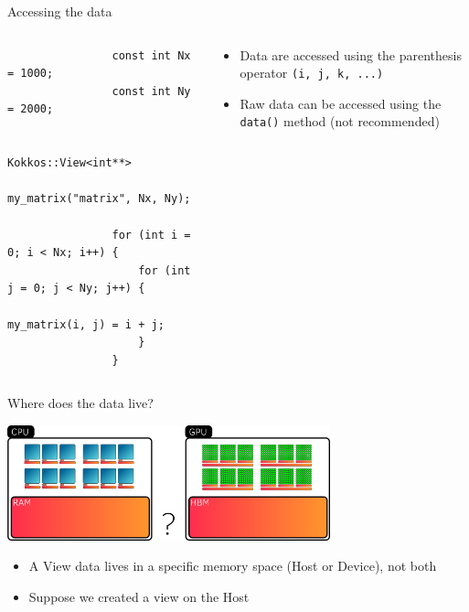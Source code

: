 \documentclass[aspectratio=169]{beamer}
\begin{document}
\begin{frame}[fragile]{Accessing the data}
    \begin{columns}
        \begin{column}{0.6\linewidth}
            \begin{verbatim}
                const int Nx = 1000;
                const int Ny = 2000;

                Kokkos::View<int**>
                    my_matrix("matrix", Nx, Ny);

                for (int i = 0; i < Nx; i++) {
                    for (int j = 0; j < Ny; j++) {
                        my_matrix(i, j) = i + j;
                    }
                }
            \end{verbatim}
        \end{column}
        \begin{column}{0.4\linewidth}
            \begin{itemize}
                \item Data are accessed using the parenthesis operator \texttt{(i, j, k, ...)}
                \item Raw data can be accessed using the \texttt{data()} method (not recommended)
            \end{itemize}
        \end{column}
    \end{columns}
\end{frame}


\begin{frame}{Where does the data live?}
    \begin{center}
        \includegraphics[width=0.7\textwidth]{view_memory.png}
    \end{center}
    \begin{itemize}
        \item A View data lives in a specific memory space (Host or Device), not both
        \item Suppose we created a view on the Host
    \end{itemize}
\end{frame}
\end{document}

